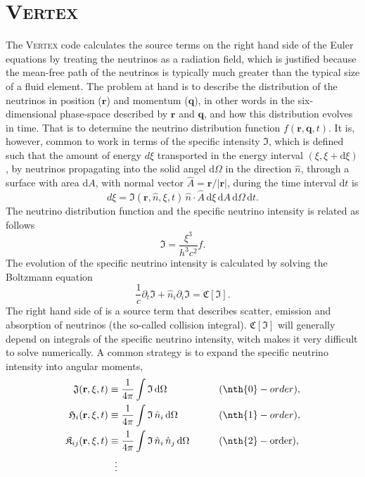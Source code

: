 \section{\textsc{Vertex}}
The \textsc{Vertex} code calculates the source terms on the right hand side of the
Euler equations by treating the neutrinos as a radiation field, which is justified
because the mean-free path of the neutrinos is typically much greater than the
typical size of a fluid element. The problem at hand is to describe 
the distribution of the neutrinos in position ($\mathbf{r}$) and momentum ($\mathbf{q}$),
in other words in the six-dimensional phase-space described by $\mathbf{r}$ and $\mathbf{q}$,
and how this distribution evolves in time.
That is to determine the neutrino distribution function $f(\mathbf{r},\mathbf{q},t)$.
It is, however, common to work in terms of the specific intensity $\mathfrak{I}$,
which is defined such that the amount of energy $d\xi$ transported in the energy interval
$(\xi,\xi+\mathrm{d}\xi)$, by neutrinos propagating into 
the solid angel $\mathrm{d}\Omega$ in the direction $\hat{n}$,
through a surface with area $\mathrm{d}A$, with normal vector $\hat{A} = \mathbf{r}/|\mathbf{r}|$, 
during the time interval $\mathrm{d}t$ is
\begin{equation} \label{eqN:intns}
d \xi = \mathfrak{I}(\mathbf{r},\hat{n},\xi,t) \, \hat{n} \cdot \hat{A}
\, \mathrm{d}\xi \, \mathrm{d}A \, \mathrm{d}\Omega \, \mathrm{d}t.
\end{equation}
The neutrino distribution function and the specific neutrino intensity is related as follows
\begin{equation}
\mathfrak{I} = \frac{\xi^3}{h^3 c^2} f.
\end{equation}
The evolution of the specific neutrino intensity is calculated by solving the Boltzmann equation
\begin{equation} \label{eqN:boltz}
\frac{1}{c} \partial_t \mathfrak{I} + \hat{n}_i \partial_i \mathfrak{I} = \mathfrak{C} [\mathfrak{I}].
\end{equation}
The right hand side of  is a source term that describes scatter, emission and absorption
of neutrinos (the so-called collision integral). $\mathfrak{C} [\mathfrak{I}]$ will generally depend on integrals of the specific neutrino intensity, witch makes it very difficult to solve numerically. 
A common strategy is to expand the specific neutrino intensity into angular moments,
\begin{alignat}{2}
\mathfrak{J}(\mathbf{r},\xi,t) &\equiv  \frac{1}{4\pi} \int \mathfrak{I} \, \mathrm{d} \Omega &&\qquad (\nth{0}-order), \\ 
\mathfrak{H}_i(\mathbf{r},\xi,t) &\equiv  \frac{1}{4\pi} \int \mathfrak{I} \, \hat{n}_i \, \mathrm{d} \Omega &&\qquad (\nth{1}-order), \\
\mathfrak{K}_{ij}(\mathbf{r},\xi,t) &\equiv  \frac{1}{4\pi} \int \mathfrak{I} \, \hat{n}_i \, \hat{n}_j \, \mathrm{d} \Omega &&\qquad (\nth{2}-\text{order}), \\
& \ \ \vdots && \nonumber
\end{alignat}
